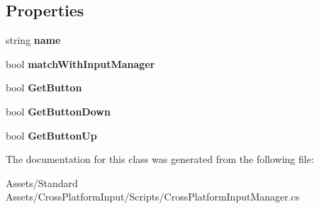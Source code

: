 \subsection*{Properties}
\begin{DoxyCompactItemize}
\item 
string {\bfseries name}\hypertarget{class_unity_standard_assets_1_1_cross_platform_input_1_1_cross_platform_input_manager_1_1_virtual_button_a2c32a0ba1321140c06327f467ed12071}{}\label{class_unity_standard_assets_1_1_cross_platform_input_1_1_cross_platform_input_manager_1_1_virtual_button_a2c32a0ba1321140c06327f467ed12071}

\item 
bool {\bfseries match\+With\+Input\+Manager}\hypertarget{class_unity_standard_assets_1_1_cross_platform_input_1_1_cross_platform_input_manager_1_1_virtual_button_a463a12ebf8d58cbc22fd79fb0d5df773}{}\label{class_unity_standard_assets_1_1_cross_platform_input_1_1_cross_platform_input_manager_1_1_virtual_button_a463a12ebf8d58cbc22fd79fb0d5df773}

\item 
bool {\bfseries Get\+Button}\hypertarget{class_unity_standard_assets_1_1_cross_platform_input_1_1_cross_platform_input_manager_1_1_virtual_button_a00be3af37f8695641b92263b882f93fa}{}\label{class_unity_standard_assets_1_1_cross_platform_input_1_1_cross_platform_input_manager_1_1_virtual_button_a00be3af37f8695641b92263b882f93fa}

\item 
bool {\bfseries Get\+Button\+Down}\hypertarget{class_unity_standard_assets_1_1_cross_platform_input_1_1_cross_platform_input_manager_1_1_virtual_button_af331b4d07b4ba657cf2ef28ec9b6da7b}{}\label{class_unity_standard_assets_1_1_cross_platform_input_1_1_cross_platform_input_manager_1_1_virtual_button_af331b4d07b4ba657cf2ef28ec9b6da7b}

\item 
bool {\bfseries Get\+Button\+Up}\hypertarget{class_unity_standard_assets_1_1_cross_platform_input_1_1_cross_platform_input_manager_1_1_virtual_button_ac1c38eca63e5d5cc12113152bad02011}{}\label{class_unity_standard_assets_1_1_cross_platform_input_1_1_cross_platform_input_manager_1_1_virtual_button_ac1c38eca63e5d5cc12113152bad02011}

\end{DoxyCompactItemize}


The documentation for this class was generated from the following file\+:\begin{DoxyCompactItemize}
\item 
Assets/\+Standard Assets/\+Cross\+Platform\+Input/\+Scripts/Cross\+Platform\+Input\+Manager.\+cs\end{DoxyCompactItemize}
